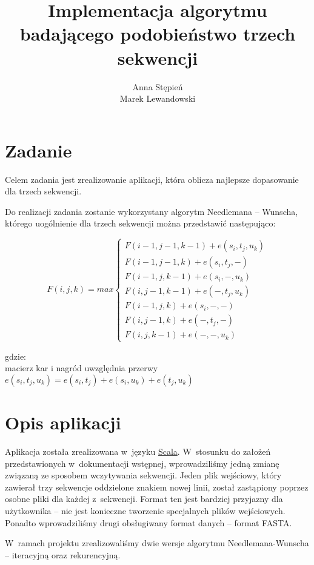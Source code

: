 \documentclass[12pt, a4paper]{article}
\title{\textbf{Implementacja algorytmu badającego podobieństwo trzech sekwencji}}
\author{Anna Stępień \\ Marek Lewandowski}
\date{}
\begin{document}
\maketitle

\section{Zadanie}
Celem zadania jest zrealizowanie aplikacji, która oblicza najlepsze dopasowanie dla trzech sekwencji. 

Do realizacji zadania zostanie wykorzystany algorytm Needlemana -- Wunscha, którego uogólnienie dla trzech sekwencji można przedstawić następująco:

\begin{equation}
  F(i, j, k)= max \begin{cases}
    F(i-1, j-1, k-1) + e(s_i, t_j, u_k)\\
    F(i-1, j-1, k) + e(s_i, t_j, -)\\
    F(i-1, j, k-1) + e(s_i, -,u_k)\\
    F(i, j-1, k-1) + e(-, t_j, u_k)\\
    F(i-1, j, k) + e(s_i, -, -)\\
    F(i, j-1, k) + e(-, t_j, -)\\
    F(i, j, k-1) + e(-, -, u_k)
  \end{cases}
\end{equation}

gdzie:\\
macierz kar i nagród uwzględnia przerwy\\
$e(s_i, t_j, u_k) = e(s_i, t_j) + e(s_i, u_k) + e(t_j, u_k)$\\

\section{Opis aplikacji}
Aplikacja została zrealizowana w~języku \href{http://www.scala-lang.org/}{Scala}. W~stosunku do założeń przedstawionych w~dokumentacji wstępnej, wprowadziliśmy jedną zmianę związaną ze sposobem wczytywania sekwencji. Jeden plik wejściowy, który zawierał trzy sekwencje oddzielone znakiem nowej linii, został zastąpiony poprzez osobne pliki dla każdej z~sekwencji. Format ten jest bardziej przyjazny dla użytkownika -- nie jest konieczne tworzenie specjalnych plików wejściowych. Ponadto wprowadziliśmy drugi obsługiwany format danych -- format FASTA. 

W~ramach projektu zrealizowaliśmy dwie wersje algorytmu Needlemana-Wunscha -- iteracyjną oraz rekurencyjną.
\end{document}
